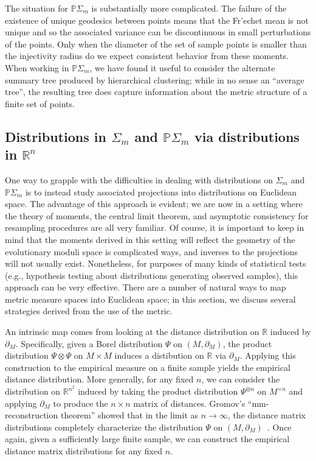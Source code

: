\documentclass[a4paper,11pt]{article}
\begin{document}
The situation for $\mathbb{P}\Sigma_m$ is substantially more complicated.
The failure of the existence of unique geodesics between points means that the Fr'echet mean is not unique and so the associated variance can be discontinuous in small perturbations of the points.
Only when the diameter of the set of sample points is smaller than the injectivity radius do we expect consistent behavior from these moments.
When working in $\mathbb{P}\Sigma_m$, we have found it useful to consider the alternate summary tree produced by hierarchical clustering; while in no sense an ``average tree'', the resulting tree does capture information about the metric structure of a finite set of points.

\subsection{Distributions in $\Sigma_m$ and $\mathbb{P}\Sigma_m$ via distributions in $\mathbb{R}^n$}

One way to grapple with the difficulties in dealing with distributions on $\Sigma_m$ and $\mathbb{P}\Sigma_m$ is to instead study associated projections into distributions on Euclidean space.
The advantage of this approach is evident; we are now in a setting where the theory of moments, the central limit theorem, and asymptotic consistency for resampling procedures are all very familiar.
Of course, it is important to keep in mind that the moments derived in this setting will reflect the geometry of the evolutionary moduli space is complicated ways, and inverses to the projections will not usually exist.
Nonetheless, for purposes of many kinds of statistical tests (e.g., hypothesis testing about distributions generating observed samples), this approach can be very effective.
There are a number of natural ways to map metric measure spaces into Euclidean space; in this section, we discuss several strategies derived from the use of the metric.

An intrinsic map comes from looking at the distance distribution on $\mathbb{R}$ induced by $\partial_M$.
Specifically, given a Borel distribution $\Psi$ on $(M, \partial_M)$, the product distribution $\Psi \otimes \Psi$ on $M \times M$ induces a distibution on $\mathbb{R}$ via $\partial_M$.
Applying this construction to the empirical measure on a finite sample yields the empirical distance distribution.
More generally, for any fixed $n$, we can consider the distribution on $\mathbb{R}^{n^2}$ induced by taking the product distribution $\Psi^{\otimes n}$ on $M^{\times n}$ and applying $\partial_M$ to produce the $n \times n$ matrix of distances.
Gromov's ``mm-reconstruction theorem'' showed that in the limit as $n \to \infty$, the distance matrix distributions completely characterize the distribution $\Psi$ on $(M, \partial_M)$~\cite{gromov1981}.
Once again, given a sufficiently large finite sample, we can construct the empirical distance matrix distributions for any fixed $n$.
\end{document}
